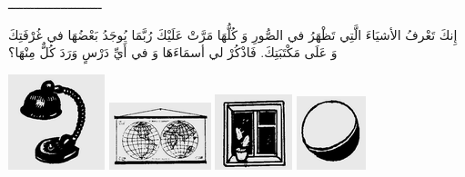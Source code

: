 \documentclass[a5paper]{article}
\begin{document}
ـــــــــــــــــــــــــ

إِنكَ تَعْرفُ الأشيَاءَ الَّتِي تَظْهَرُ في الصُّورِ وَ كُلُّهَا مَرَّتْ عَلَيْكَ رُبَّمَا يُوجَدُ بَعْضُهَا في غُرْفَتِكَ وَ عَلَى مَكْتَبَتِكَ. فَاذْكُرْ لي أسمَاءَهَا وَ في أَيِّ دَرْسٍ وَرَدَ كُلٌّ مِنْهَا؟

 \includegraphics[width=1.1043in,height=1.0937in]{images/MuhammadBagauddinprettified-img311.png}   \includegraphics[width=1.1665in,height=0.7709in]{images/MuhammadBagauddinprettified-img312.png}   \includegraphics[width=0.8854in,height=0.8646in]{images/MuhammadBagauddinprettified-img313.png}   \includegraphics[width=0.7917in,height=0.8437in]{images/MuhammadBagauddinprettified-img314.png} 
\end{document}
